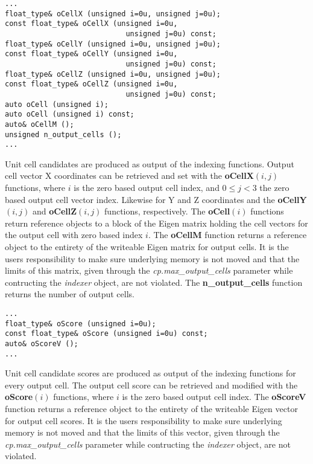 \documentclass[a4paper,10pt]{article}
\begin{document}
\begin{lstlisting}
...
float_type& oCellX (unsigned i=0u, unsigned j=0u);
const float_type& oCellX (unsigned i=0u,
                            unsigned j=0u) const;
float_type& oCellY (unsigned i=0u, unsigned j=0u);
const float_type& oCellY (unsigned i=0u,
                            unsigned j=0u) const;
float_type& oCellZ (unsigned i=0u, unsigned j=0u);
const float_type& oCellZ (unsigned i=0u,
                            unsigned j=0u) const;
auto oCell (unsigned i);
auto oCell (unsigned i) const;
auto& oCellM ();
unsigned n_output_cells ();
...
\end{lstlisting}

Unit cell candidates are produced as output of the indexing functions. Output cell vector X coordinates can be retrieved and set with the \textbf{oCellX}$(i,j)$ functions, where $i$ is the zero based output cell index, and $0\leq j<3$ the zero based output cell vector index. Likewise for Y and Z coordinates and the \textbf{oCellY}$(i,j)$ and \textbf{oCellZ}$(i,j)$ functions, respectively. The \textbf{oCell}$(i)$ functions return reference objects to a block of the Eigen matrix holding the cell vectors for the output cell with zero based index $i$. The \textbf{oCellM} function returns a reference object to the entirety of the writeable Eigen matrix for output cells. It is the users responsibility to make sure underlying memory is not moved and that the limits of this matrix, given through the \emph{cp.max\_output\_cells} parameter while contructing the \emph{indexer} object, are not violated. The \textbf{n\_output\_cells} function returns the number of output cells.

\begin{lstlisting}
...
float_type& oScore (unsigned i=0u);
const float_type& oScore (unsigned i=0u) const;
auto& oScoreV ();
...
\end{lstlisting}

Unit cell candidate scores are produced as output of the indexing functions for every output cell. The output cell score can be retrieved and modified with the \textbf{oScore}$(i)$ functions, where $i$ is the zero based output cell index. The \textbf{oScoreV} function returns a reference object to the entirety of the writeable Eigen vector for output cell scores. It is the users responsibility to make sure underlying memory is not moved and that the limits of this vector, given through the \emph{cp.max\_output\_cells} parameter while contructing the \emph{indexer} object, are not violated.
\end{document}
